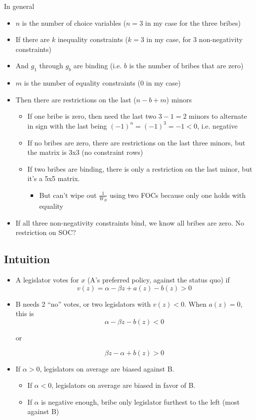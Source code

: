 \documentclass[12pt]{article}
\newcommand{\al}{\alpha}
\begin{document}
\vskip1in
In general
\begin{itemize}
	\item $n$ is the number of choice variables ($n=3$ in my case for the three bribes)
	\item If there are $k$ inequality constraints ($k=3$ in my case, for 3 non-negativity constraints)
	\item And $g_1$ through $g_b$ are binding (i.e. $b$ is the number of bribes that are zero)
	\item $m$ is the number of equality constraints (0 in my case)
	\item Then there are restrictions on the last ($n-b+m$) minors
		\begin{itemize}
			\item If one bribe is zero, then need the last two $3-1 =2$ minors to alternate in sign with the last being $(-1)^n = (-1)^3 = -1 <0$, i.e. negative
			\item If no bribes are zero, there are restrictions on the last three minors, but the matrix is 3x3 (no constraint rows)
			\item If two bribes are binding, there is only a restriction on the last minor, but it's a 5x5 matrix.
				\begin{itemize}
					\item But can't wipe out $\frac{1}{W_B}$ using two FOCs because only one holds with equality
				\end{itemize}
		\end{itemize}
	\item If all three non-negativity constraints bind, we know all bribes are zero. No restriction on SOC?
\end{itemize}

\newpage
\subsection{Intuition}
\begin{itemize}
	\item A legislator votes for $x$ (A's preferred policy, against the status quo) if 
		\[
		  v(z) = \al - \beta z + a(z) - b(z) > 0
		\]
	\item B needs 2 ``no'' votes, or two legislators with $v(z) < 0$. When $a(z) = 0$, this is
		\[
		  \al - \beta z - b(z) < 0
		\]
		
		\begin{center}
		or 
		\end{center}
		\[
		  \beta z - \al + b(z) > 0
		\]
		\item If $\al > 0$, legislators on average are biased against B.
			\begin{itemize}
				\item If $\al < 0$, legislators on average are biased in favor of B.
				\item If $\al$ is negative enough, bribe only legislator furthest to the left (most against B)
			\end{itemize}
\end{itemize}
\end{document}
